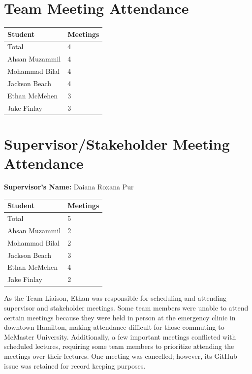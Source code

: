\documentclass[10pt, titlepage]{article}
\begin{document}
\section{Team Meeting Attendance}

\begin{table}[H]
\centering
\begin{tabular}{ll}
\toprule
\textbf{Student} & \textbf{Meetings}\\
\midrule
Total & 4\\
Ahsan Muzammil & 4 \\
Mohammad Bilal & 4 \\
Jackson Beach & 4 \\
Ethan McMehen & 3 \\
Jake Finlay & 3 \\
\bottomrule
\end{tabular}
\end{table}


\section{Supervisor/Stakeholder Meeting Attendance}

\noindent \textbf{Supervisor's Name: } Daiana Roxana Pur

\begin{table}[H]
\centering
\begin{tabular}{ll}
\toprule
\textbf{Student} & \textbf{Meetings}\\
\midrule
Total & 5\\
Ahsan Muzammil & 2 \\
Mohammad Bilal & 2 \\
Jackson Beach & 3 \\
Ethan McMehen & 4 \\
Jake Finlay & 2 \\
\bottomrule
\end{tabular}
\end{table}


As the Team Liaison, Ethan was responsible for scheduling
and attending supervisor and stakeholder meetings. Some
team members were unable to attend certain meetings because
they were held in person at the emergency clinic in downtown
Hamilton, making attendance difficult for those commuting
to McMaster University. Additionally, a few important meetings
conflicted with scheduled lectures, requiring some team
members to prioritize attending the meetings over their
lectures. One meeting was cancelled; however, its GitHub issue was retained for record keeping purposes.
\end{document}
